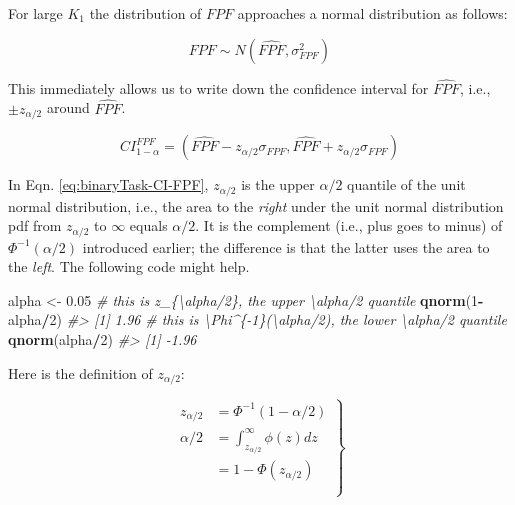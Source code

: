 \documentclass[
]{book}
\newenvironment{Shaded}{\begin{snugshade}}{\end{snugshade}}
\newcommand{\CommentTok}[1]{\textcolor[rgb]{0.56,0.35,0.01}{\textit{#1}}}
\newcommand{\DecValTok}[1]{\textcolor[rgb]{0.00,0.00,0.81}{#1}}
\newcommand{\FloatTok}[1]{\textcolor[rgb]{0.00,0.00,0.81}{#1}}
\newcommand{\KeywordTok}[1]{\textcolor[rgb]{0.13,0.29,0.53}{\textbf{#1}}}
\newcommand{\NormalTok}[1]{#1}
\newcommand{\OperatorTok}[1]{\textcolor[rgb]{0.81,0.36,0.00}{\textbf{#1}}}
\newcommand{\StringTok}[1]{\textcolor[rgb]{0.31,0.60,0.02}{#1}}
\begin{document}
For large \(K_1\) the distribution of \(FPF\) approaches a normal distribution as follows:

\[FPF \sim N\left ( \widehat{FPF}, \sigma_{FPF}^2 \right )\]

This immediately allows us to write down the confidence interval for \(\widehat{FPF}\), i.e., \(\pm z_{\alpha/2}\) around \(\widehat{FPF}\).

\begin{equation} 
CI_{1-\alpha}^{FPF}=\left ( \widehat{FPF} - z_{\alpha/2} \sigma_{FPF}, \widehat{FPF} + z_{\alpha/2} \sigma_{FPF} \right )
\label{eq:binaryTask-CI-FPF}
\end{equation}

In Eqn. \eqref{eq:binaryTask-CI-FPF}, \(z_{\alpha/2}\) is the upper \(\alpha/2\) quantile of the unit normal distribution, i.e., the area to the \emph{right} under the unit normal distribution pdf from \(z_{\alpha/2}\) to \(\infty\) equals \(\alpha/2\). It is the complement (i.e., plus goes to minus) of \(\Phi^{-1}(\alpha/2)\) introduced earlier; the difference is that the latter uses the area to the \emph{left}. The following code might help.

\begin{Shaded}
\begin{Highlighting}[]
\NormalTok{alpha \textless{}{-}}\StringTok{ }\FloatTok{0.05}
\CommentTok{\# this is z\_\{\textbackslash{}alpha/2\}, the upper \textbackslash{}alpha/2 quantile}
\KeywordTok{qnorm}\NormalTok{(}\DecValTok{1}\OperatorTok{{-}}\NormalTok{alpha}\OperatorTok{/}\DecValTok{2}\NormalTok{) }
\CommentTok{\#\textgreater{} [1] 1.96}
\CommentTok{\# this is \textbackslash{}Phi\^{}\{{-}1\}(\textbackslash{}alpha/2), the lower \textbackslash{}alpha/2 quantile}
\KeywordTok{qnorm}\NormalTok{(alpha}\OperatorTok{/}\DecValTok{2}\NormalTok{)   }
\CommentTok{\#\textgreater{} [1] {-}1.96}
\end{Highlighting}
\end{Shaded}

Here is the definition of \(z_{\alpha/2}\):

\begin{equation} 
\left.
\begin{aligned} 
z_{\alpha/2} &=\Phi^{-1}\left ( 1-\alpha/2 \right )\\
\alpha/2&=\int_{z_{\alpha/2}}^{\infty}\phi(z)dz\\ 
&= 1-\Phi(z_{\alpha/2})\\
\\
\end{aligned}
\right \} 
\label{eq:binaryTask-def-z-alpha2}
\end{equation}
\end{document}
